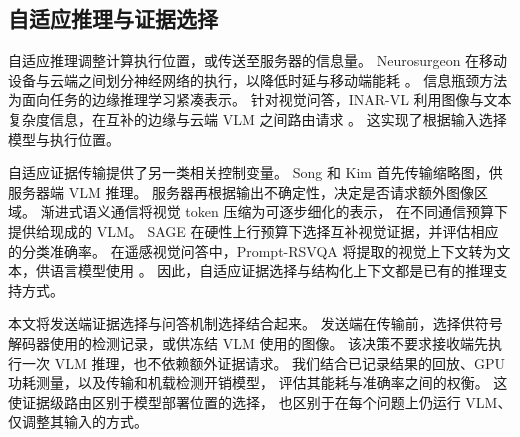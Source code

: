 \subsection{自适应推理与证据选择}
自适应推理调整计算执行位置，或传送至服务器的信息量。
Neurosurgeon 在移动设备与云端之间划分神经网络的执行，以降低时延与移动端能耗
\cite{kang2017neurosurgeon}。
信息瓶颈方法为面向任务的边缘推理学习紧凑表示\cite{shao2022taskoriented}。
针对视觉问答，INAR-VL 利用图像与文本复杂度信息，在互补的边缘与云端 VLM 之间路由请求
\cite{sabanovic2026inarvl}。
这实现了根据输入选择模型与执行位置。

自适应证据传输提供了另一类相关控制变量。
Song 和 Kim 首先传输缩略图，供服务器端 VLM 推理\cite{song2026collaborative}。
服务器再根据输出不确定性，决定是否请求额外图像区域。
渐进式语义通信将视觉 token 压缩为可逐步细化的表示，
在不同通信预算下提供给现成的 VLM\cite{hsu2026progressive}。
SAGE 在硬性上行预算下选择互补视觉证据，并评估相应的分类准确率\cite{choi2026sage}。
在遥感视觉问答中，Prompt-RSVQA 将提取的视觉上下文转为文本，供语言模型使用
\cite{chappuis2022promptrsvqa}。
因此，自适应证据选择与结构化上下文都是已有的推理支持方式。

本文将发送端证据选择与问答机制选择结合起来。
发送端在传输前，选择供符号解码器使用的检测记录，或供冻结 VLM 使用的图像。
该决策不要求接收端先执行一次 VLM 推理，也不依赖额外证据请求。
我们结合已记录结果的回放、GPU 功耗测量，以及传输和机载检测开销模型，
评估其能耗与准确率之间的权衡。
这使证据级路由区别于模型部署位置的选择，
也区别于在每个问题上仍运行 VLM、仅调整其输入的方式。
